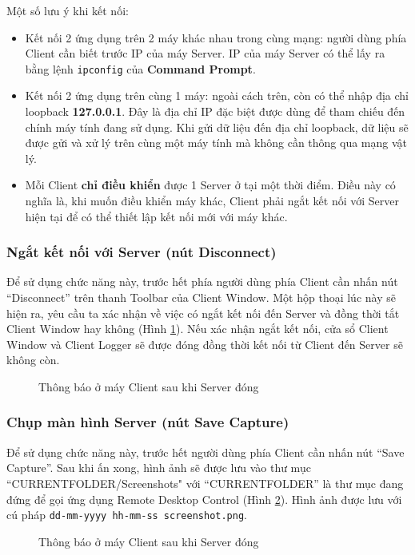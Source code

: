 Một số lưu ý khi kết nối:
\begin{itemize}
	\item  Kết nối 2 ứng dụng trên 2 máy khác nhau trong cùng mạng: người dùng phía Client cần biết trước IP của máy Server. IP của máy Server có thể lấy ra bằng lệnh \verb|ipconfig| của \textbf{Command Prompt}.
	\item Kết nối 2 ứng dụng trên cùng 1 máy: ngoài cách trên, còn có thể nhập địa chỉ loopback \textbf{127.0.0.1}. Đây là địa chỉ IP đặc biệt được dùng để tham chiếu đến chính máy tính đang sử dụng. Khi gửi dữ liệu đến địa chỉ loopback, dữ liệu sẽ được gửi và xử lý trên cùng một máy tính mà không cần thông qua mạng vật lý.
	\item Mỗi Client \textbf{chỉ điều khiển} được 1 Server ở tại một thời điểm. Điều này có nghĩa là, khi muốn điều khiển máy khác, Client phải ngắt kết nối với Server hiện tại để có thể thiết lập kết nối mới với máy khác.
\end{itemize}

\subsubsection{Ngắt kết nối với Server (nút Disconnect)}
Để sử dụng chức năng này, trước hết phía người dùng phía Client cần nhấn nút ``Disconnect'' trên thanh Toolbar của Client Window. Một hộp thoại lúc này sẽ hiện ra, yêu cầu ta xác nhận về việc có ngắt kết nối đến Server và đồng thời tắt Client Window hay không (Hình \ref{fig:ClientDisconnectDialog}). Nếu xác nhận ngắt kết nối, cửa sổ Client Window và Client Logger sẽ được đóng đồng thời kết nối từ Client đến Server sẽ không còn.

\begin{figure}[H]
	\caption{Thông báo ở máy Client sau khi Server đóng}
	\label{fig:ClientDisconnectDialog}
\end{figure}

\subsubsection{Chụp màn hình Server (nút Save Capture)}
Để sử dụng chức năng này, trước hết người dùng phía Client cần nhấn nút ``Save Capture''. Sau khi ấn xong, hình ảnh sẽ được lưu vào thư mục ``CURRENTFOLDER\slash Screenshots" với ``CURRENTFOLDER'' là thư mục đang đứng để gọi ứng dụng Remote Desktop Control (Hình \ref{fig:ScreenshotsDirectory}). Hình ảnh được lưu với cú pháp \newline \noindent \verb|dd-mm-yyyy hh-mm-ss screenshot.png|.

\begin{figure}[H]
	\caption{Thông báo ở máy Client sau khi Server đóng}
	\label{fig:ScreenshotsDirectory}
\end{figure}